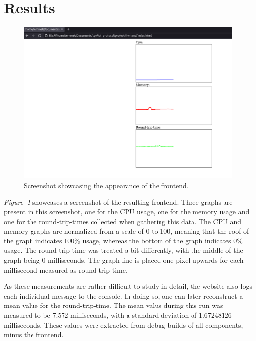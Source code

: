 \section{Results}
\label{ch:results}
\noindent	

\begin{figure}[H]
	\begin{center}
		\includegraphics[width=\textwidth]{./img/stonks_graph.png}
		\caption{Screenshot showcasing the appearance of the frontend.}
		\label{final-screenshot}
	\end{center}
\end{figure}

\textit{Figure~\ref{final-screenshot}} showcases a screenshot of the resulting frontend. Three graphs are present in this screenshot, one for the CPU usage, one for the memory usage and one for the round-trip-times collected when gathering this data. The CPU and memory graphs are normalized from a scale of 0 to 100, meaning that the roof of the graph indicates 100\% usage, whereas the bottom of the graph indicates 0\% usage. The round-trip-time was treated a bit differently, with the middle of the graph being 0 milliseconds. The graph line is placed one pixel upwards for each millisecond measured as round-trip-time. 

As these measurements are rather difficult to study in detail, the website also logs each individual message to the console. In doing so, one can later reconstruct a mean value for the round-trip-time. The mean value during this run was measured to be $7.572$ milliseconds, with a standard deviation of $1.67248126$ milliseconds. These values were extracted from debug builds of all components, minus the frontend.

